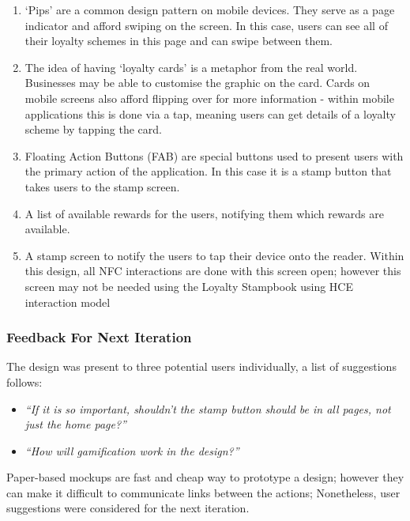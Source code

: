 \begin{enumerate}
  \item `Pips' are a common design pattern on mobile devices. They serve as a page indicator and afford swiping on the screen. In this case, users can see all of their loyalty schemes in this page and can swipe between them. 
  \item The idea of having `loyalty cards' is a metaphor from the real world. Businesses may be able to customise the graphic on the card.  Cards on mobile screens also afford flipping over for more information - within mobile applications this is done via a tap, meaning users can get details of a loyalty scheme by tapping the card.  
  \item Floating Action Buttons (FAB) are special buttons used to present users with the primary action of the application. In this case it is a stamp button that takes users to the stamp screen.
  \item A list of available rewards for the users, notifying them which rewards are available.
  \item A stamp screen to notify the users to tap their device onto the reader. Within this design, all NFC interactions are done with this screen open; however this screen may not be needed using the Loyalty Stampbook using HCE interaction model
\end{enumerate}

\subsubsection{Feedback For Next Iteration}
The design was present to three potential users individually, a list of suggestions follows:
\begin{itemize}
  \item \textit{``If it is so important, shouldn't the stamp button should be in all pages, not just the home page?''}
  \item \textit{``How will gamification work in the design?''}
\end{itemize}

Paper-based mockups are fast and cheap way to prototype a design; however they can make it difficult to communicate links between the actions; Nonetheless, user suggestions were considered for the next iteration.


